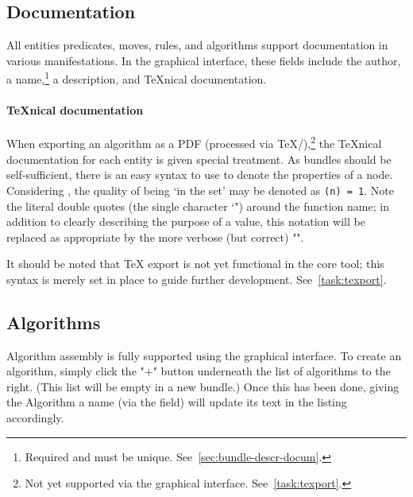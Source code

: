 \subsection{Documentation}
All entities \Dash predicates, moves, rules, and algorithms \Dash support documentation in various manifestations.
In the graphical interface, these fields include the author,
  a name,\footnote{Required and must be unique.  See~\autoref{sec:bundle-descr-docum}.}
  a description, and \TeX nical documentation.
\paragraph{\TeX nical documentation}
When exporting an algorithm as a PDF (processed via \TeX\slash\TikZ),\footnote{%
  Not yet supported via the graphical interface.
  See~\autoref{task:texport}.}
  the \TeX nical documentation for each entity is given special treatment.
As bundles should be self-sufficient,
  there is an easy syntax to use to denote the properties of a node.
Considering , the quality of being \enquote*{in the set}
  may be denoted as \texttt{(n) = 1}.
Note the literal double quotes (the single character \char`") around the function name;
  in addition to clearly describing the purpose of a value,
  this notation will be replaced as appropriate by
  the more verbose (but correct) "".

It should be noted that {\TeX} export is not yet functional in the core tool;
  this syntax is merely set in place to guide further development.
See~\autoref{task:texport}.
\subsection{Algorithms}

Algorithm assembly is fully supported using the graphical interface.
To create an algorithm, simply click the "+" button underneath the list of algorithms to the right.
(This list will be empty in a new bundle.)
Once this has been done, giving the Algorithm a name (via the  field)
  will update its text in the listing accordingly.

